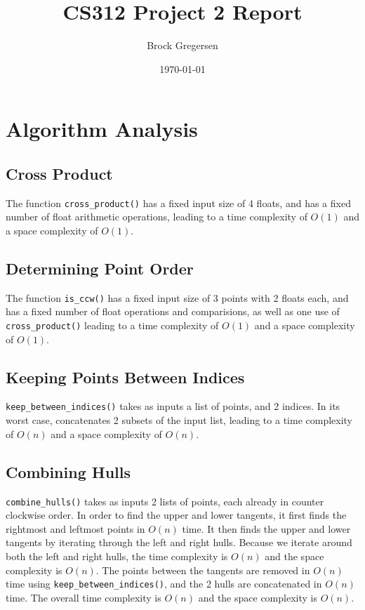 \documentclass[12pt]{article}
\title{CS312 Project 2 Report}
\author{Brock Gregersen}
\date{\today}
\begin{document}
\maketitle

\section{Algorithm Analysis}

\subsection{Cross Product}
The function \texttt{cross\_product()} has a fixed input size of 4 
floats, and has a fixed number of float arithmetic operations, leading to a
time complexity of $O(1)$ and a space complexity of $O(1)$.

\subsection{Determining Point Order}
The function \texttt{is\_ccw()} has a fixed input size of 3 points
with 2 floats each, and has a fixed number of float operations and
comparisions, as well as one use of \texttt{cross\_product()}
leading to a time complexity of $O(1)$ and a space complexity of $O(1)$.

\subsection{Keeping Points Between Indices}
\texttt{keep\_between\_indices()} takes as inputs a list of points,
and 2 indices. In its worst case, concatenates 2 subsets of the
input list, leading to a time complexity of $O(n)$ and a space
complexity of $O(n)$.

\subsection{Combining Hulls}
\texttt{combine\_hulls()} takes as inputs 2 lists of points, each 
already in counter clockwise order. In order to find the upper and
lower tangents, it first finds the rightmost and leftmost points
in $O(n)$ time. It then finds the upper and lower tangents by iterating
through the left and right hulls. Because we iterate around both the left
and right hulls, the time complexity is $O(n)$ and the space complexity
is $O(n)$. The points between the tangents are removed in $O(n)$ time
using \texttt{keep\_between\_indices()}, and the 2 hulls are concatenated
in $O(n)$ time. The overall time complexity is $O(n)$ and the space
complexity is $O(n)$.
\end{document}
